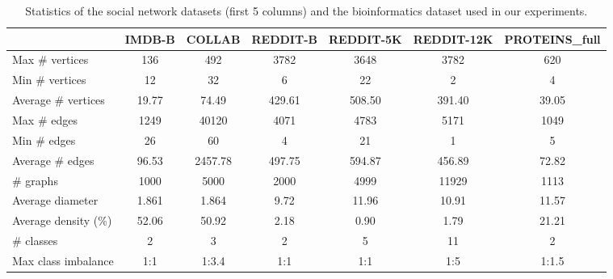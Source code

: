 \documentclass[sigconf]{acmart}
\begin{document}
\begin{table*}[!t]
\begin{center}
\begin{tabular}{|lccccc|c|} \hline
& IMDB-B & COLLAB & REDDIT-B & REDDIT-5K & REDDIT-12K & PROTEINS\_full \\ \hline\hline
Max \# vertices & 136 & 492 & 3782 & 3648 & 3782 & 620\\
Min \# vertices & 12 & 32 & 6 & 22 & 2 & 4\\
Average \# vertices & 19.77 & 74.49 & 429.61 & 508.50 & 391.40 & 39.05 \\ \hline
Max \# edges & 1249 & 40120 & 4071 & 4783 & 5171 & 1049\\
Min \# edges & 26 & 60 & 4 & 21 & 1 & 5\\
Average \# edges & 96.53 & 2457.78 & 497.75 & 594.87 & 456.89 & 72.82\\ \hline
\# graphs & 1000 & 5000 & 2000 & 4999 & 11929 & 1113\\ \hline
Average diameter & 1.861 & 1.864 & 9.72 & 11.96 & 10.91 & 11.57 \\ \hline
Average density (\%) & 52.06 & 50.92 & 2.18 & 0.90 & 1.79 & 21.21\\ \hline
\# classes & 2 & 3 & 2 & 5 & 11 & 2\\ \hline
Max class imbalance & 1:1 &  1:3.4 & 1:1 &  1:1 &  1:5 & 1:1.5\\ \hline
\end{tabular}
\captionsetup{justification=centering, size=small}
\caption{\label{tab:stats} Statistics of the social network datasets (first 5 columns) and the bioinformatics dataset used in our experiments.}
\end{center}
\end{table*}
\end{document}
